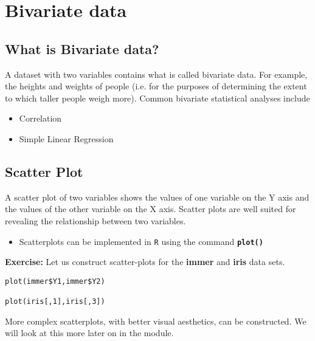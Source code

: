 \documentclass[ModuleBmain.tex]{subfiles}
\begin{document}
\newpage
\section{Bivariate data}
\subsection{What is Bivariate data?}

A dataset with two variables contains what is called bivariate data. For example, the heights and weights of people (i.e. for the purposes of determining the extent to which taller people weigh more). Common bivariate statistical analyses include
\begin{itemize}
\item Correlation
\item Simple Linear Regression
\end{itemize}

\subsection{Scatter Plot} A scatter plot of two variables shows the values of one variable on the Y axis and the values of the other variable on the X axis. Scatter plots are well suited for revealing the relationship between two variables.

\begin{itemize}
\item Scatterplots can be implemented in \texttt{R} using the command \texttt{\textbf{plot()}}
\end{itemize}
\noindent \textbf{Exercise:} Let us construct scatter-plots for the \textbf{immer} and \textbf{iris} data sets.

\begin{framed}
\begin{verbatim}
plot(immer$Y1,immer$Y2)

plot(iris[,1],iris[,3])
\end{verbatim}
\end{framed}
More complex scatterplots, with better visual aesthetics, can be constructed. We will look at this more later on in the module.
\end{document}
